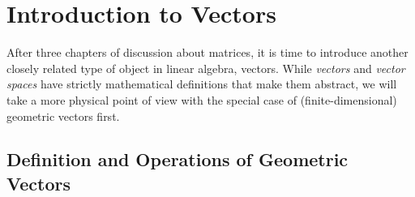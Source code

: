 \chapter{Introduction to Vectors}

After three chapters of discussion about matrices, it is time to introduce another closely related type of object in linear algebra, vectors. While \textit{vectors} and \textit{vector spaces} have strictly mathematical definitions that make them abstract, we will take a more physical point of view with the special case of (finite-dimensional) geometric vectors first.

\section{Definition and Operations of Geometric Vectors}

